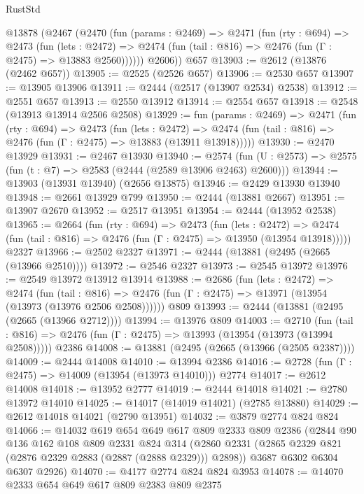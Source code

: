 \begin{lexlean}{RustStd}
\begin{coremodule}
    @13878
      (@2467
        (@2470
          (fun (params : @2469) =>
          @2471
            (fun (rty : @694) =>
            @2473
              (fun (lets : @2472) =>
              @2474 (fun (tail : @816) => @2476 (fun (Γ : @2475) => @13883 @2560))))))
        @2606))
    @657
@13903 := @2612 (@13876 (@2462 @657))
@13905 := @2525 (@2526 @657)
@13906 := @2530 @657
@13907 := @13905 @13906
@13911 := @2444 (@2517 (@13907 @2534) @2538)
@13912 := @2551 @657
@13913 := @2550 @13912
@13914 := @2554 @657
@13918 := @2548 (@13913 @13914 @2506 @2508)
@13929 := fun (params : @2469) =>
  @2471
    (fun (rty : @694) =>
    @2473
      (fun (lets : @2472) =>
      @2474 (fun (tail : @816) => @2476 (fun (Γ : @2475) => @13883 (@13911 @13918)))))
@13930 := @2470 @13929
@13931 := @2467 @13930
@13940 := @2574
    (fun (U : @2573) => @2575 (fun (t : @7) => @2583 (@2444 (@2589 @13906 @2463) @2600)))
@13944 := @13903 (@13931 @13940) (@2656 @13875)
@13946 := @2429 @13930 @13940
@13948 := @2661 @13929 @799
@13950 := @2444 (@13881 @2667)
@13951 := @13907 @2670
@13952 := @2517 @13951
@13954 := @2444 (@13952 @2538)
@13965 := @2664
    (fun (rty : @694) =>
    @2473
      (fun (lets : @2472) =>
      @2474 (fun (tail : @816) => @2476 (fun (Γ : @2475) => @13950 (@13954 @13918)))))
    @2327
@13966 := @2502 @2327
@13971 := @2444 (@13881 (@2495 (@2665 (@13966 @2510))))
@13972 := @2546 @2327
@13973 := @2545 @13972
@13976 := @2549 @13972 @13912 @13914
@13988 := @2686
    (fun (lets : @2472) =>
    @2474
      (fun (tail : @816) =>
      @2476 (fun (Γ : @2475) => @13971 (@13954 (@13973 (@13976 @2506 @2508))))))
    @809
@13993 := @2444 (@13881 (@2495 (@2665 (@13966 @2712))))
@13994 := @13976 @809
@14003 := @2710
    (fun (tail : @816) => @2476 (fun (Γ : @2475) => @13993 (@13954 (@13973 (@13994 @2508)))))
    @2386
@14008 := @13881 (@2495 (@2665 (@13966 (@2505 @2387))))
@14009 := @2444 @14008
@14010 := @13994 @2386
@14016 := @2728 (fun (Γ : @2475) => @14009 (@13954 (@13973 @14010))) @2774
@14017 := @2612 @14008
@14018 := @13952 @2777
@14019 := @2444 @14018
@14021 := @2780 @13972 @14010
@14025 := @14017 (@14019 @14021) (@2785 @13880)
@14029 := @2612 @14018 @14021 (@2790 @13951)
@14032 := @3879 @2774 @824 @824
@14066 := @14032
    @619
    @654
    @649
    @617
    @809
    @2333
    @809
    @2386
    (@2844
      @90
      @136
      @162
      @108
      @809
      @2331
      @824
      @314
      (@2860 @2331 (@2865 @2329 @821 (@2876 @2329 @2883 (@2887 (@2888 @2329))) @2898))
      @3687
      @6302
      @6304
      @6307
      @2926)
@14070 := @4177 @2774 @824 @824 @3953
@14078 := @14070 @2333 @654 @649 @617 @809 @2383 @809 @2375

\end{coremodule}
\end{lexlean}
